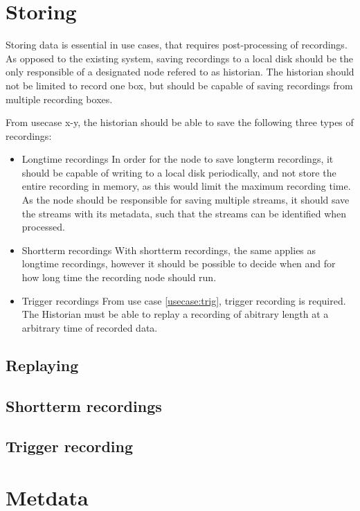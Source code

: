 \section{Storing}
Storing data is essential in use cases, that requires post-processing of recordings. As opposed to the existing system, saving recordings to a local disk should be the only responsible of a designated node refered to as historian.
The historian should not be limited to record one box, but should be capable of saving recordings from multiple recording boxes.

From usecase x-y, the historian should be able to save the following three types of recordings:
\begin{itemize}
	\item Longtime recordings
		In order for the node to save longterm recordings, it should be capable of writing 			to a local disk periodically, and not store the entire recording in memory, 			as this would limit the maximum recording time. As the node should be responsible for 				saving multiple streams, it should save the streams with its metadata, such that the streams can be identified when processed.
	\item Shortterm recordings
		With shortterm recordings, the same applies as longtime recordings, however it 				should be possible to decide when and for how long time the recording node should 			run.
	\item Trigger recordings
		From use case \ref{usecase:trig}, trigger recording is required. The Historian must be able to replay a recording of abitrary length at a arbitrary time of recorded data.
\end{itemize}

\subsection{Replaying}

 
 
\subsection{Shortterm recordings}

\subsection{Trigger recording}

\section{Metdata}
